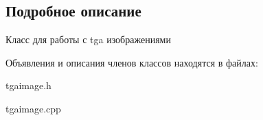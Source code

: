 \subsection{Подробное описание}
Класс для работы с tga изображениями 

Объявления и описания членов классов находятся в файлах\+:\begin{DoxyCompactItemize}
\item 
tgaimage.\+h\item 
tgaimage.\+cpp\end{DoxyCompactItemize}
